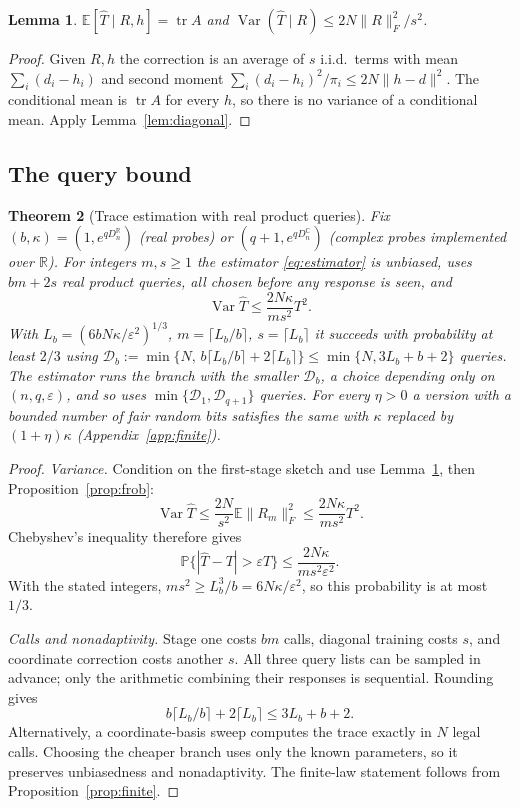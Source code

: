 \documentclass[11pt,a4paper]{article}
\newtheorem{theorem}{Theorem}[section]
\newtheorem{lemma}[theorem]{Lemma}
\theoremstyle{definition}\newtheorem{definition}[theorem]{Definition}
\theoremstyle{remark}\newtheorem{remark}[theorem]{Remark}
\numberwithin{equation}{section}
\newcommand{\E}{\mathbb E}
\newcommand{\Prob}{\mathbb P}
\newcommand{\R}{\mathbb R}
\newcommand{\C}{\mathbb C}
\newcommand{\tr}{\operatorname{tr}}
\newcommand{\Var}{\operatorname{Var}}
\newcommand{\norm}[1]{\lVert#1\rVert}
\newcommand{\eps}{\varepsilon}
\begin{document}
\begin{lemma}\label{lem:variance}
$\E[\widehat T\mid R,h]=\tr A$ and $\Var(\widehat T\mid R)\le2N\norm R_F^2/s^2$.
\end{lemma}
\begin{proof}
Given $R,h$ the correction is an average of $s$ i.i.d.\ terms with mean
$\sum_i(d_i-h_i)$ and second moment $\sum_i(d_i-h_i)^2/\pi_i\le2N\norm{h-d}^2$.
The conditional mean is $\tr A$ for every $h$, so there is no variance of a
conditional mean. Apply Lemma~\ref{lem:diagonal}.
\end{proof}

\subsection{The query bound}
\begin{theorem}[Trace estimation with real product queries]\label{thm:queries}
Fix $(b,\kappa)=(1,e^{qD_n^{\R}})$ (real probes) or $(q+1,e^{qD_n^{\C}})$ (complex
probes implemented over $\R$). For integers $m,s\ge1$ the estimator
\eqref{eq:estimator} is unbiased, uses $bm+2s$ real product queries, all chosen
before any response is seen, and
\begin{equation}\label{eq:main-var}
 \Var\widehat T\le\frac{2N\kappa}{ms^2}T^2 .
\end{equation}
With $L_b=(6bN\kappa/\eps^2)^{1/3}$, $m=\lceil L_b/b\rceil$, $s=\lceil L_b\rceil$ it
succeeds with probability at least $2/3$ using
$\mathcal D_b:=\min\{N,\,b\lceil L_b/b\rceil+2\lceil L_b\rceil\}\le\min\{N,3L_b+b+2\}$
queries. The estimator runs the branch with the smaller $\mathcal D_b$, a choice
depending only on $(n,q,\eps)$, and so uses $\min\{\mathcal D_1,\mathcal D_{q+1}\}$ queries.
For every $\eta>0$ a version with a bounded number of fair random bits
satisfies the same with $\kappa$ replaced by $(1+\eta)\kappa$ (Appendix~\ref{app:finite}).
\end{theorem}
\begin{proof}
\emph{Variance.}
Condition on the first-stage sketch and use
Lemma~\ref{lem:variance}, then Proposition~\ref{prop:frob}:
\[
 \Var\widehat T
 \le\frac{2N}{s^2}\E\|R_m\|_F^2
 \le\frac{2N\kappa}{ms^2}T^2.
\]
Chebyshev's inequality therefore gives
\[
 \Prob\{|\widehat T-T|>\eps T\}
 \le\frac{2N\kappa}{ms^2\eps^2}.
\]
With the stated integers, \(ms^2\ge L_b^3/b=6N\kappa/\eps^2\),
so this probability is at most \(1/3\).

\emph{Calls and nonadaptivity.}
Stage one costs \(bm\) calls, diagonal training costs \(s\), and coordinate
correction costs another \(s\). All three query lists can be sampled in
advance; only the arithmetic combining their responses is sequential.
Rounding gives
\[
 b\lceil L_b/b\rceil+2\lceil L_b\rceil\le3L_b+b+2.
\]
Alternatively, a coordinate-basis sweep computes the trace exactly in
\(N\) legal calls. Choosing the cheaper branch uses only the known
parameters, so it preserves unbiasedness and nonadaptivity.
The finite-law statement follows from Proposition~\ref{prop:finite}.
\end{proof}
\end{document}
